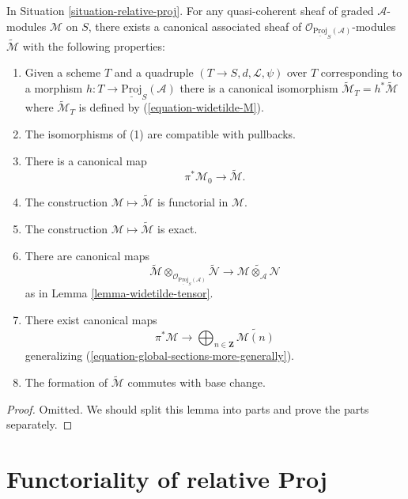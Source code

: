 \begin{lemma}
\label{lemma-relative-proj-modules}
In Situation \ref{situation-relative-proj}.
For any quasi-coherent sheaf of graded $\mathcal{A}$-modules
$\mathcal{M}$ on $S$, there exists a canonical associated sheaf
of $\mathcal{O}_{\underline{\text{Proj}}_S(\mathcal{A})}$-modules
$\widetilde{\mathcal{M}}$ with the following properties:
\begin{enumerate}
\item Given a scheme $T$ and a quadruple
$(T \to S, d, \mathcal{L}, \psi)$ over $T$
corresponding to a morphism
$h : T \to \underline{\text{Proj}}_S(\mathcal{A})$ there is
a canonical isomorphism
$\widetilde{\mathcal{M}}_T = h^*\widetilde{\mathcal{M}}$
where $\widetilde{\mathcal{M}}_T$ is defined by (\ref{equation-widetilde-M}).
\item The isomorphisms of (1) are compatible with pullbacks.
\item There is a canonical map
$$
\pi^*\mathcal{M}_0 \longrightarrow \widetilde{\mathcal{M}}.
$$
\item The construction $\mathcal{M} \mapsto \widetilde{\mathcal{M}}$
is functorial in $\mathcal{M}$.
\item The construction $\mathcal{M} \mapsto \widetilde{\mathcal{M}}$
is exact.
\item There are canonical maps
$$
\widetilde{\mathcal{M}}
\otimes_{\mathcal{O}_{\underline{\text{Proj}}_S(\mathcal{A})}}
\widetilde{\mathcal{N}}
\longrightarrow
\widetilde{\mathcal{M} \otimes_\mathcal{A} \mathcal{N}}
$$
as in
Lemma \ref{lemma-widetilde-tensor}.
\item There exist canonical maps
$$
\pi^*\mathcal{M}
\longrightarrow
\bigoplus\nolimits_{n \in \mathbf{Z}}
\widetilde{\mathcal{M}(n)}
$$
generalizing (\ref{equation-global-sections-more-generally}).
\item The formation of $\widetilde{\mathcal{M}}$ commutes with base change.
\end{enumerate}
\end{lemma}

\begin{proof}
Omitted. We should split this lemma into parts and prove the parts separately.
\end{proof}












\section{Functoriality of relative Proj}
\label{section-functoriality-relative-proj}

